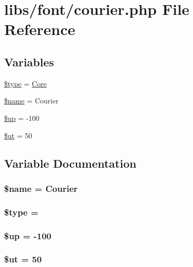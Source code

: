\hypertarget{courier_8php}{}\section{libs/font/courier.php File Reference}
\label{courier_8php}
\subsection*{Variables}
\begin{DoxyCompactItemize}
\item 
\hyperlink{courier_8php_a9a4a6fba2208984cabb3afacadf33919}{\$type} = \textquotesingle{}\hyperlink{class_core}{Core}\textquotesingle{}
\item 
\hyperlink{courier_8php_ab2fc40d43824ea3e1ce5d86dee0d763b}{\$name} = \textquotesingle{}Courier\textquotesingle{}
\item 
\hyperlink{courier_8php_a6b5ad2ac55f9df46e8f34e78fbd6f176}{\$up} = -\/100
\item 
\hyperlink{courier_8php_aadd3f841051043ee58e587e840e8dd0b}{\$ut} = 50
\end{DoxyCompactItemize}


\subsection{Variable Documentation}
\hypertarget{courier_8php_ab2fc40d43824ea3e1ce5d86dee0d763b}{}
\subsubsection[{\$name}]{\setlength{\rightskip}{0pt plus 5cm}\$name = \textquotesingle{}Courier\textquotesingle{}}\label{courier_8php_ab2fc40d43824ea3e1ce5d86dee0d763b}
\hypertarget{courier_8php_a9a4a6fba2208984cabb3afacadf33919}{}
\subsubsection[{\$type}]{\setlength{\rightskip}{0pt plus 5cm}\$type = \textquotesingle{}}\label{courier_8php_a9a4a6fba2208984cabb3afacadf33919}
\hypertarget{courier_8php_a6b5ad2ac55f9df46e8f34e78fbd6f176}{}
\subsubsection[{\$up}]{\setlength{\rightskip}{0pt plus 5cm}\$up = -\/100}\label{courier_8php_a6b5ad2ac55f9df46e8f34e78fbd6f176}
\hypertarget{courier_8php_aadd3f841051043ee58e587e840e8dd0b}{}
\subsubsection[{\$ut}]{\setlength{\rightskip}{0pt plus 5cm}\$ut = 50}\label{courier_8php_aadd3f841051043ee58e587e840e8dd0b}
